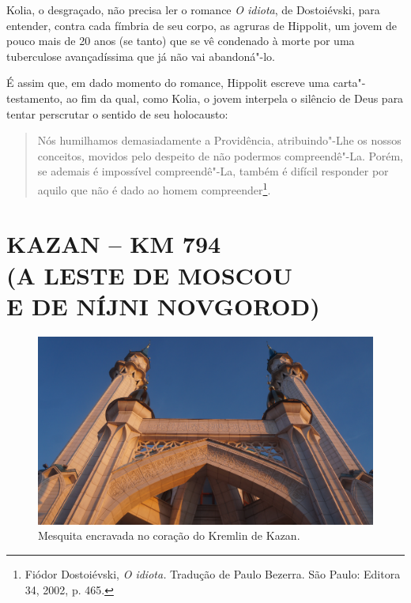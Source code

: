 Kolia, o desgraçado, não precisa ler o romance \emph{O idiota}, de
Dostoiévski, para entender, contra cada fímbria de seu corpo, as agruras
de Hippolit, um jovem de pouco mais de 20 anos (se tanto) que se vê
condenado à morte por uma tuberculose avançadíssima que já não vai
abandoná"-lo.

É assim que, em dado momento do romance, Hippolit escreve uma
carta"-testamento, ao fim da qual, como Kolia, o jovem interpela o
silêncio de Deus para tentar perscrutar o sentido de seu holocausto:

\begin{quote}
Nós humilhamos demasiadamente a Providência, atribuindo"-Lhe os nossos
conceitos, movidos pelo despeito de não podermos compreendê"-La. Porém,
se ademais é impossível compreendê"-La, também é difícil responder por
aquilo que não é dado ao homem compreender\footnote{Fiódor Dostoiévski,
  \emph{O idiota.} Tradução de Paulo Bezerra. São Paulo: Editora 34,
  2002, p. 465.}.
\end{quote}

\clearpage
\thispagestyle{empty}


\makeatletter\@openrightfalse
\movetooddpage
\part*{KAZAN -- KM 794\\(A LESTE DE MOSCOU\\E DE NÍJNI NOVGOROD)}

\movetoevenpage
\begin{absolutelynopagebreak}
\begin{vplace}
\begin{figure}[H]
\begin{adjustwidth}{-1.8cm}{}
  \vspace{2.7cm}
  \includegraphics[width=130mm]{./imgs/kazan2.jpg}  
\end{adjustwidth}
  \caption{Mesquita encravada no coração do Kremlin de Kazan.}

\thispagestyle{empty}

\end{figure}
\end{vplace}

\end{absolutelynopagebreak}

